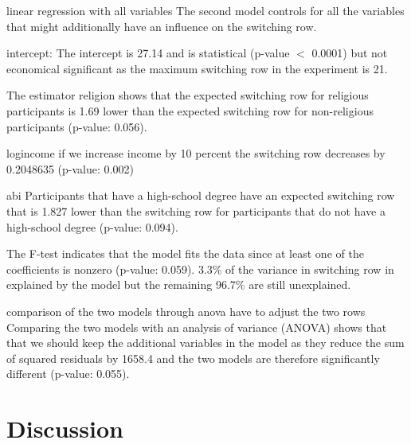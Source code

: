 \documentclass[12pt,a4paper]{article}
\begin{document}
linear regression with all variables
The second model controls for all the variables that might additionally have an influence on the switching row.


intercept: 
The intercept is 27.14 and is statistical (p-value $<$ 0.0001) but not economical significant as the maximum switching row in the experiment is 21. 

The estimator religion shows that the expected switching row for religious participants is  1.69 lower than the expected switching row for non-religious participants (p-value: 0.056).

logincome 
if we increase income by 10 percent the switching row decreases by 0.2048635 (p-value: 0.002)


abi
Participants that have a high-school degree have an expected switching row that is 1.827 lower than the switching row for participants that do not have a high-school degree (p-value: 0.094).



The F-test indicates that the model fits the data since at least one of the coefficients is nonzero (p-value: 0.059). 
3.3\% of the variance in switching row in explained by the model but the remaining 96.7\% are still unexplained. 


comparison of the two models through anova 
have to adjust the two rows 
Comparing the two models with an analysis of variance (ANOVA) shows that that we should keep the additional variables in the model as they reduce the sum of squared residuals by 1658.4 and the two models are therefore significantly different (p-value: 0.055). 




 
\section{Discussion}
\end{document}
